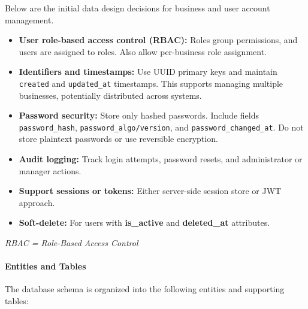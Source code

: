 \documentclass[]{VUMIFTemplateClass}
\begin{document}
Below are the initial data design decisions for business and user account management. 
\begin{itemize}
    \item \textbf{User role-based access control (RBAC):} Roles group permissions, and users are assigned to roles. Also allow per-business role assignment.
    \item \textbf{Identifiers and timestamps:} Use UUID primary keys and maintain \texttt{created} and \texttt{updated\_at} timestamps. This supports managing multiple businesses, potentially distributed across systems.
    \item \textbf{Password security:} Store only hashed passwords. Include fields \texttt{password\_hash}, \texttt{password\_algo/version}, and \texttt{password\_changed\_at}. Do not store plaintext passwords or use reversible encryption.
    \item \textbf{Audit logging:} Track login attempts, password resets, and administrator or manager actions.
    \item \textbf{Support sessions or tokens:} Either server-side session store or JWT approach.
    \item \textbf{Soft-delete:} For users with \textbf{is\_active} and \textbf{deleted\_at} attributes.
\end{itemize}
\textit{RBAC = Role-Based Access Control}

\paragraph{Entities and Tables}  

The database schema is organized into the following entities and supporting tables:  
\end{document}
